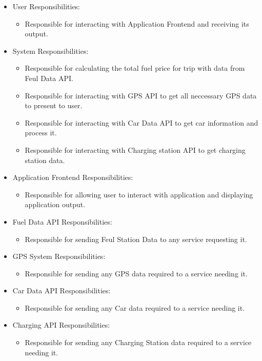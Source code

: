\documentclass[12pt]{article}
\begin{document}
\begin{itemize}
\item User Responsibilities:
\begin{itemize}
\item Responsible for interacting with Application Frontend and receiving its output. 
\end{itemize}
\item \progname{} System Responsibilities:
\begin{itemize}
\item Responsible for calculating the total fuel price for trip with data from 
Feul Data API.
\item Responsible for interacting with GPS API to get all neccessary GPS data 
to present to user.
\item Responsible for interacting with Car Data API to get car information 
and process it.
\item Responsible for interacting with Charging station API to get charging 
station data.
\end{itemize}
\item Application Frontend Responsibilities:
\begin{itemize}
\item Responsible for allowing user to interact with application and displaying application output.
\end{itemize}
\item Fuel Data API Responsibilities:
\begin{itemize}
\item Responsible for sending Feul Station Data to any service requesting it.
\end{itemize}
\item GPS System Responsibilities:
\begin{itemize}
\item Responsible for sending any GPS data required to a service needing it.
\end{itemize}
\item Car Data API Responsibilities:
\begin{itemize}
\item Responsible for sending any Car data required to a service needing it.
\end{itemize}
\item Charging API Responsibilities:
\begin{itemize}
\item Responsible for sending any Charging Station data required to a service needing it.
\end{itemize}
\end{itemize}
\end{document}
